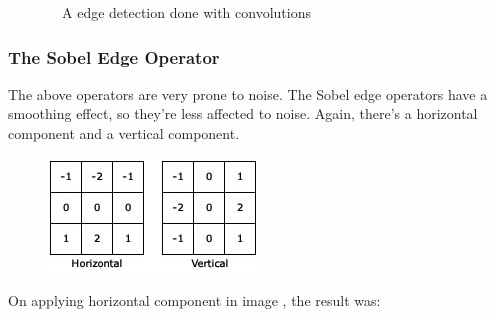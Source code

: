 \begin{figure}[H]
	\centering
	\caption{~~A edge detection done with convolutions}
\end{figure}


\subsubsection{The Sobel Edge Operator}
The above operators are very prone to noise. The Sobel edge operators have a smoothing effect, so they're less affected to noise. Again, there's a horizontal component and a vertical component.
\begin{figure}[!htbp]
	\centering
	\includegraphics[width=.4\textwidth]{6DL/figures/sobel}\\
\end{figure}

On applying horizontal component in image , the result was:\\

